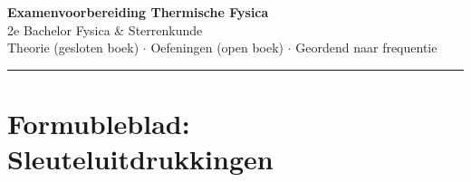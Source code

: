 \documentclass[10pt,a4paper]{article}
\begin{document}
\begin{center}
{\Large\bfseries\color{headerbg} Examenvoorbereiding Thermische Fysica}\\[2pt]
{\large 2e Bachelor Fysica \& Sterrenkunde}\\[4pt]
{\normalsize\color{gray} Theorie (gesloten boek) $\cdot$ Oefeningen (open boek) $\cdot$ Geordend naar frequentie}
\end{center}
\vspace{-3mm}
\noindent\textcolor{headerbg}{\rule{\linewidth}{1.5pt}}

\section{Formubleblad: Sleuteluitdrukkingen}
\end{document}

